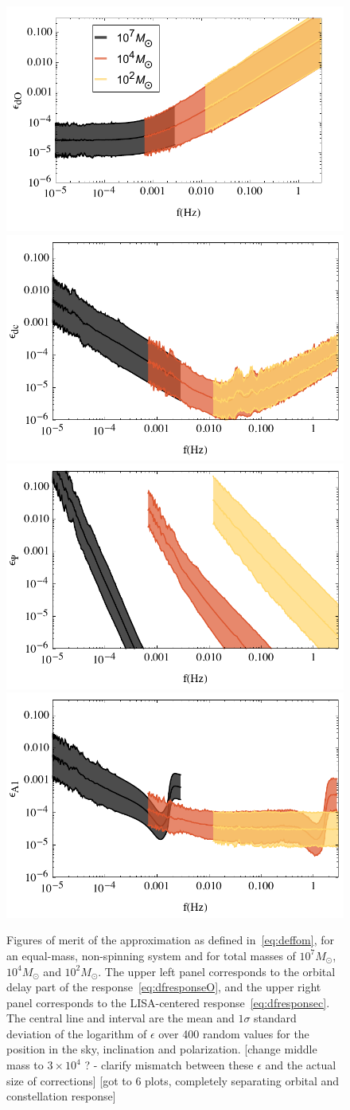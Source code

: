 \documentclass[aps,showpacs,twocolumn,
prd,superscriptaddress,nofootinbib]{revtex4-1}
\newcommand{\Msol}{M_{\odot}}
\newcommand{\SM}[1]{{\color{Red} #1}}
\begin{document}
\begin{figure}
  \centering
  \includegraphics[width=.48\linewidth]{plots/LISAfomdO.pdf}
  \hspace{0.2cm}
  \includegraphics[width=.48\linewidth]{plots/LISAfomdc.pdf}
  \includegraphics[width=.48\linewidth]{plots/LISAfomPsi2.pdf}
  \hspace{0.2cm}
  \includegraphics[width=.48\linewidth]{plots/LISAfomA1.pdf}
  \caption{Figures of merit of the approximation as defined in~\eqref{eq:deffom}, for an equal-mass, non-spinning system and for total masses of $10^{7} \Msol$, $10^{4} \Msol$ and $10^{2} \Msol$. The upper left panel corresponds to the orbital delay part of the response~\eqref{eq:dfresponseO}, and the upper right panel corresponds to the LISA-centered response~\eqref{eq:dfresponsec}. The central line and interval are the mean and $1\sigma$ standard deviation of the logarithm of $\epsilon$ over 400 random values for the position in the sky, inclination and polarization. \SM{[change middle mass to $3\times 10^{4}$ ? - clarify mismatch between these $\epsilon$ and the actual size of corrections]} \SM{[got to 6 plots, completely separating orbital and constellation response]}}
  \label{fig:fomLISA}
\end{figure}
\end{document}
